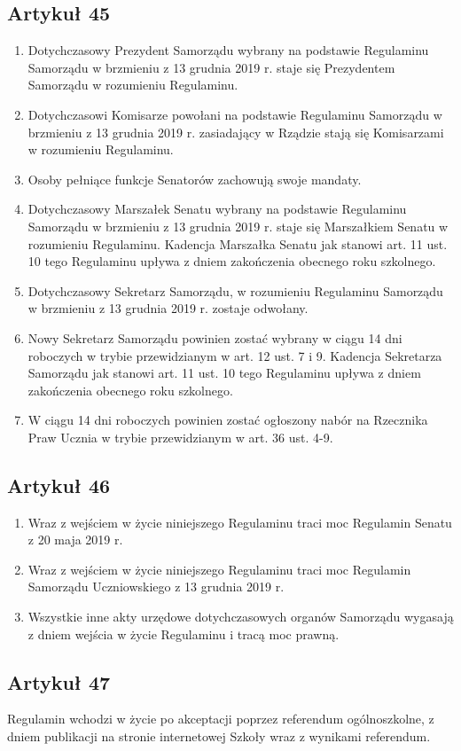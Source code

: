 \documentclass[14pt]{article}
\newenvironment{ustepy}{%
	\begin{enumerate}[leftmargin=1.5em, itemindent=1pt, labelwidth=1em, itemsep=5pt]
	}{%
	\end{enumerate}
}
\begin{document}
\subsection*{Artykuł 45}
\begin{ustepy}
	\item Dotychczasowy Prezydent Samorządu wybrany na podstawie Regulaminu Samorządu w brzmieniu z 13 grudnia 2019 r. staje się Prezydentem Samorządu w rozumieniu Regulaminu.
	\item Dotychczasowi Komisarze powołani na podstawie Regulaminu Samorządu w brzmieniu z 13 grudnia 2019 r. zasiadający w Rządzie stają się Komisarzami w rozumieniu Regulaminu.
	\item Osoby pełniące funkcje Senatorów zachowują swoje mandaty.
	\item Dotychczasowy Marszałek Senatu wybrany na podstawie Regulaminu Samorządu w brzmieniu z 13 grudnia 2019 r. staje się Marszałkiem Senatu w rozumieniu Regulaminu. Kadencja Marszałka Senatu jak stanowi art. 11 ust. 10 tego Regulaminu upływa z dniem zakończenia obecnego roku szkolnego.
	\item Dotychczasowy Sekretarz Samorządu, w rozumieniu Regulaminu Samorządu w brzmieniu z 13 grudnia 2019 r. zostaje odwołany.
	\item Nowy Sekretarz Samorządu powinien zostać wybrany w ciągu 14 dni roboczych w trybie przewidzianym w art. 12 ust. 7 i 9. Kadencja Sekretarza Samorządu jak stanowi art. 11 ust. 10 tego Regulaminu upływa z dniem zakończenia obecnego roku szkolnego.
	\item W ciągu 14 dni roboczych powinien zostać ogłoszony nabór na Rzecznika Praw Ucznia w trybie przewidzianym w art. 36 ust. 4-9.
\end{ustepy}
\subsection*{Artykuł 46}
\begin{ustepy}
	\item Wraz z wejściem w życie niniejszego Regulaminu traci moc Regulamin Senatu z 20 maja 2019 r.
	\item Wraz z wejściem w życie niniejszego Regulaminu traci moc Regulamin Samorządu Uczniowskiego z 13 grudnia 2019 r.
	\item Wszystkie inne akty urzędowe dotychczasowych organów Samorządu wygasają z dniem wejścia w życie Regulaminu i tracą moc prawną.
\end{ustepy}
\subsection*{Artykuł 47}
Regulamin wchodzi w życie po akceptacji poprzez referendum ogólnoszkolne, z dniem publikacji na stronie internetowej Szkoły wraz z wynikami referendum.

	
\end{document}

